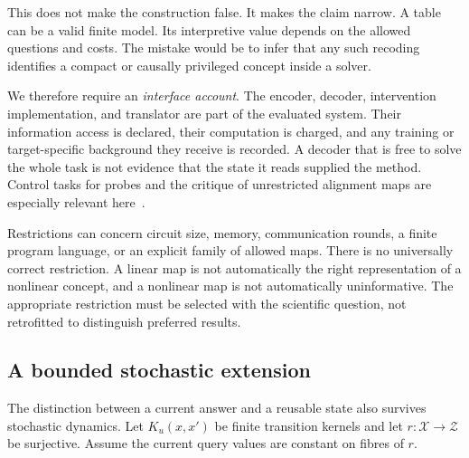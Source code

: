 \documentclass[11pt,letterpaper]{article}
\theoremstyle{plain}
\theoremstyle{definition}
\newcommand{\X}{\mathcal X}\newcommand{\Z}{\mathcal Z}
\begin{document}
This does not make the construction false. It makes the claim narrow. A table can be a valid finite model. Its interpretive value depends on the allowed questions and costs. The mistake would be to infer that any such recoding identifies a compact or causally privileged concept inside a solver.

We therefore require an \emph{interface account}. The encoder, decoder, intervention implementation, and translator are part of the evaluated system. Their information access is declared, their computation is charged, and any training or target-specific background they receive is recorded. A decoder that is free to solve the whole task is not evidence that the state it reads supplied the method. Control tasks for probes and the critique of unrestricted alignment maps are especially relevant here~\cite{hewitt,sutter}.

Restrictions can concern circuit size, memory, communication rounds, a finite program language, or an explicit family of allowed maps. There is no universally correct restriction. A linear map is not automatically the right representation of a nonlinear concept, and a nonlinear map is not automatically uninformative. The appropriate restriction must be selected with the scientific question, not retrofitted to distinguish preferred results.

\subsection{A bounded stochastic extension}
The distinction between a current answer and a reusable state also survives stochastic dynamics. Let $K_u(x,x')$ be finite transition kernels and let $r:\X\to\Z$ be surjective. Assume the current query values are constant on fibres of $r$.
\end{document}

